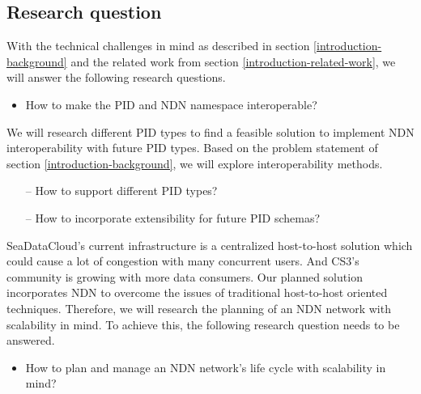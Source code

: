 \subsection{Research question}
\label{introduction-research-question}
With the technical challenges in mind as described in section \ref{introduction-background} and the related work from section \ref{introduction-related-work}, we will answer the following research questions. 

\begin{itemize}
	\item How to make the PID and NDN namespace interoperable?
\end{itemize}

We will research different PID types to find a feasible solution to implement NDN interoperability with future PID types. Based on the problem statement of section \ref{introduction-background}, 
we will explore interoperability methods.


\begin{itemize}
    \item[--] How to support different PID types?
    \item[--] How to incorporate extensibility for future PID schemas?
\end{itemize}


SeaDataCloud's current infrastructure is a centralized host-to-host solution which could cause a lot of congestion with many concurrent users. And CS3's community is growing with more data consumers. Our planned solution incorporates NDN to overcome the issues of traditional host-to-host oriented techniques. Therefore, we will research the planning of an NDN network with scalability in mind. To achieve this, the following research question needs to be answered.   
\begin{itemize}
    \item How to plan and manage an NDN network's life cycle with scalability in mind?
\end{itemize}

